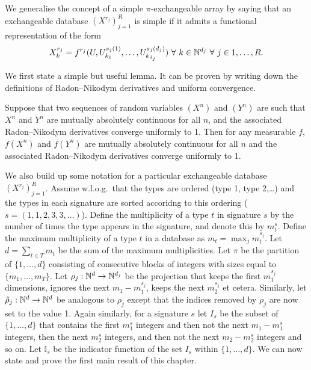 We generalise the concept of a simple $\pi$-exchangeable array by saying that an exchangeable database $(X^{r_j})_{j=1}^R$ is simple if it admits a functional representation of the form
\begin{equation}
  X^{r_j}_{k} = f^{r_j}(U, U^{s_{j}(1)}_{k_1},\dots,U^{s_{j}(d_j)}_{k_{d_j}}) \,\, \forall \,\, k \in \mathbb{N}^{d_j} \,\, \forall \,\, j \in {1,\dots,R}.
\end{equation}

We first state a simple but useful lemma.
It can be proven by writing down the definitions of Radon--Nikodym derivatives and uniform convergence.

\begin{lem}
  \label{lem:contractionrnd}
  Suppose that two sequences of random variables $(X^n)$ and $(Y^n)$ are such that $X^n$ and $Y^n$ are mutually absolutely continuous for all $n$, and the associated Radon--Nikodym derivatives converge uniformly to 1.
  Then for any measurable $f$, $f(X^n)$ and $f(Y^n)$ are mutually absolutely continuous for all $n$ and the associated Radon--Nikodym derivatives converge uniformly to 1.
\end{lem}

We also build up some notation for a particular exchangeable database $(X^{r_j})_{j=1}^R$.%
Assume w.l.o.g.\ that the types are ordered (\eg type 1, type 2,\dots) and the types in each signature are sorted accoridng to this ordering (\eg $s = (1,1,2,3,3,\dots)$).
Define the multiplicity of a type $t$ in signature $s$ by the number of times the type appears in the signature, and denote this by $m_{t}^s$.
Define the maximum multiplicity of a type $t$ in a database as $m_t = \max_j m_t^{s_j}$.
Let $d = \sum_{t\in T} m_t$ be the sum of the maximum multiplicities.
Let $\pi$ be the partition of $\{1,\ldots,d\}$ consisting of consecutive blocks of integers with sizes equal to $\{m_1,\ldots,m_T\}$.
Let $\rho_j : \mathbb{N}^d \to \mathbb{N}^{d_j}$ be the projection that keeps the first $m_{1}^{s_j}$ dimensions, ignores the next $m_1 - m_{1}^{s_j}$, keeps the next $m_{2}^{s_j}$ et cetera.
Similarly, let $\tilde{\rho}_j : \mathbb{N}^d \to \mathbb{N}^d$ be analogous to $\rho_j$ except that the indices removed by $\rho_j$ are now set to the value 1.
Again similarly, for a signature $s$ let $I_s$ be the subset of $\{1,\ldots,d\}$ that contains the first $m_1^s$ integers and then not the next $m_1 - m_1^s$ integers, then the next $m_2^s$ integers, and then not the next $m_2 - m_2^s$ integers and so on.
Let $\mathbb{I}_s$ be the indicator function of the set $I_s$ within $\{1,\ldots,d\}$.
We can now state and prove the first main result of this chapter.


